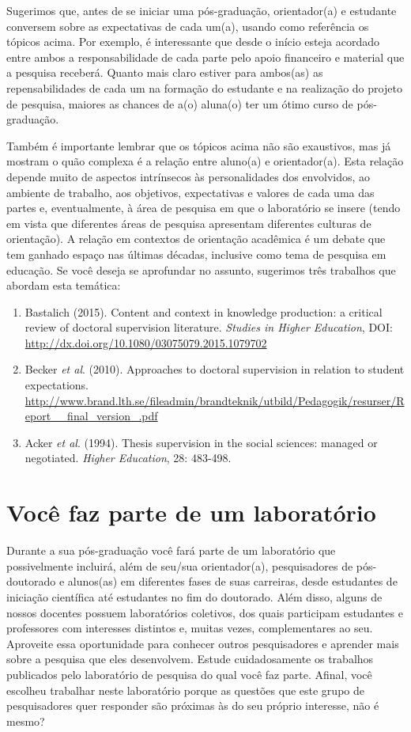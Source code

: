 \documentclass[twoside a4paper 12pt]{report}
\begin{document}
Sugerimos que, antes de se iniciar uma pós-graduação, orientador(a) e
estudante conversem sobre as expectativas de cada um(a), usando como
referência os tópicos acima. Por exemplo, é interessante que desde o
início esteja acordado entre ambos a responsabilidade de cada parte
pelo apoio financeiro e material que a pesquisa receberá. Quanto mais
claro estiver para ambos(as) as repensabilidades de cada um na
formação do estudante e na realização do projeto de pesquisa, maiores
as chances de a(o) aluna(o) ter um ótimo curso de pós-graduação.

Também é importante lembrar que os tópicos acima não são exaustivos,
mas já mostram o quão complexa é a relação entre aluno(a) e
orientador(a). Esta relação depende muito de aspectos intrínsecos às
personalidades dos envolvidos, ao ambiente de trabalho, aos objetivos,
expectativas e valores de cada uma das partes e, eventualmente, à área
de pesquisa em que o laboratório se insere (tendo em vista que
diferentes áreas de pesquisa apresentam diferentes culturas de
orientação). A relação em contextos de orientação acadêmica é um
debate que tem ganhado espaço nas últimas décadas, inclusive como tema
de pesquisa em educação. Se você deseja se aprofundar no assunto,
sugerimos três trabalhos que abordam esta temática:
\begin{enumerate}
\item Bastalich (2015). Content and context in knowledge production: a
  critical review of doctoral supervision literature. \textit{Studies
    in Higher Education}, DOI:
  {\url{http://dx.doi.org/10.1080/03075079.2015.1079702}}
\item Becker \textit{et al}. (2010). Approaches to doctoral
  supervision in relation to student
  expectations. {\url{http://www.brand.lth.se/fileadmin/brandteknik/utbild/Pedagogik/resurser/Report__final_version_.pdf}}
\item Acker \textit{et al}. (1994). Thesis supervision in the social
  sciences: managed or negotiated. \textit{Higher Education}, 28:
  483-498.
\end{enumerate}

\section{Você faz parte de um laboratório}

Durante a sua pós-graduação você fará parte de um laboratório que
possivelmente incluirá, além de seu/sua orientador(a), pesquisadores
de pós-doutorado e alunos(as) em diferentes fases de suas carreiras,
desde estudantes de iniciação científica até estudantes no fim do
doutorado. Além disso, alguns de nossos docentes possuem laboratórios
coletivos, dos quais participam estudantes e professores com
interesses distintos e, muitas vezes, complementares ao seu. Aproveite
essa oportunidade para conhecer outros pesquisadores e aprender mais
sobre a pesquisa que eles desenvolvem. Estude cuidadosamente os
trabalhos publicados pelo laboratório de pesquisa do qual você faz
parte. Afinal, você escolheu trabalhar neste laboratório porque as
questões que este grupo de pesquisadores quer responder são próximas
às do seu próprio interesse, não é mesmo?
\end{document}
